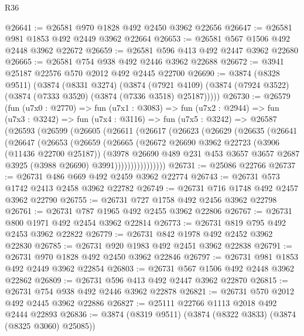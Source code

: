 \begin{lexlean}{R36}
\begin{coremodule}
@26641 := @26581 @970 @1828 @492 @2450 @3962 @22656
@26647 := @26581 @981 @1853 @492 @2449 @3962 @22664
@26653 := @26581 @567 @1506 @492 @2448 @3962 @22672
@26659 := @26581 @596 @413 @492 @2447 @3962 @22680
@26665 := @26581 @754 @938 @492 @2446 @3962 @22688
@26672 := @3941 @25187 @22576 @570 @2012 @492 @2445 @22700
@26690 := @3874
    (@8328 @9511)
    (@3874
      (@8331 @3274)
      (@3874
        (@7921 @4109)
        (@3874 (@7924 @3522) (@3874 (@7333 @3520) (@3874 (@7336 @3518) @25187)))))
@26730 := @26579
    (fun (u7x0 : @2770) =>
    fun (u7x1 : @3083) =>
    fun (u7x2 : @2944) =>
    fun (u7x3 : @3242) =>
    fun (u7x4 : @3116) =>
    fun (u7x5 : @3242) =>
    @26587
      (@26593
        (@26599
          (@26605
            (@26611
              (@26617
                (@26623
                  (@26629
                    (@26635
                      (@26641
                        (@26647
                          (@26653
                            (@26659
                              (@26665
                                (@26672
                                  @26690
                                  @3962
                                  @22723
                                  (@3906 (@11436 @22700 @25187))
                                  (@3978
                                    @26690
                                    @489
                                    @231
                                    @453
                                    @3657
                                    @3657
                                    @2687
                                    @3925
                                    (@3988 @26690)
                                    @3991))))))))))))))))
@26731 := @25086 @22766
@26737 := @26731 @486 @669 @492 @2459 @3962 @22774
@26743 := @26731 @573 @1742 @2413 @2458 @3962 @22782
@26749 := @26731 @716 @1748 @492 @2457 @3962 @22790
@26755 := @26731 @727 @1758 @492 @2456 @3962 @22798
@26761 := @26731 @787 @1965 @492 @2455 @3962 @22806
@26767 := @26731 @800 @1971 @492 @2454 @3962 @22814
@26773 := @26731 @819 @795 @492 @2453 @3962 @22822
@26779 := @26731 @842 @1978 @492 @2452 @3962 @22830
@26785 := @26731 @920 @1983 @492 @2451 @3962 @22838
@26791 := @26731 @970 @1828 @492 @2450 @3962 @22846
@26797 := @26731 @981 @1853 @492 @2449 @3962 @22854
@26803 := @26731 @567 @1506 @492 @2448 @3962 @22862
@26809 := @26731 @596 @413 @492 @2447 @3962 @22870
@26815 := @26731 @754 @938 @492 @2446 @3962 @22878
@26821 := @26731 @570 @2012 @492 @2445 @3962 @22886
@26827 := @25111 @22766 @1113 @2018 @492 @2444 @22893
@26836 := @3874 (@8319 @9511) (@3874 (@8322 @3833) (@3874 (@8325 @3060) @25085))

\end{coremodule}
\end{lexlean}
